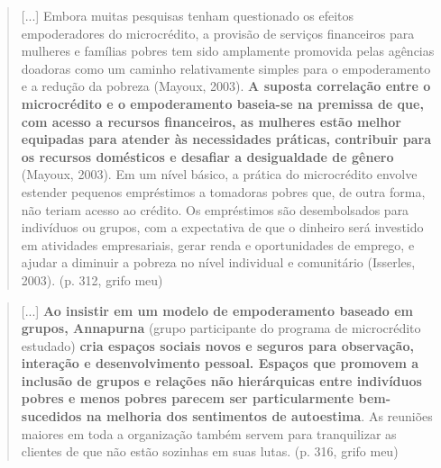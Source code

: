 \begin{quote}
    [...] Embora muitas pesquisas tenham questionado os efeitos empoderadores do microcrédito, a provisão de serviços financeiros para mulheres e famílias pobres tem sido amplamente promovida pelas agências doadoras como um caminho relativamente simples para o empoderamento e a redução da pobreza (Mayoux, 2003). \textbf{A suposta correlação entre o microcrédito e o empoderamento baseia-se na premissa de que, com acesso a recursos financeiros, as mulheres estão melhor equipadas para atender às necessidades práticas, contribuir para os recursos domésticos e desafiar a desigualdade de gênero} (Mayoux, 2003). Em um nível básico, a prática do microcrédito envolve estender pequenos empréstimos a tomadoras pobres que, de outra forma, não teriam acesso ao crédito. Os empréstimos são desembolsados para indivíduos ou grupos, com a expectativa de que o dinheiro será investido em atividades empresariais, gerar renda e oportunidades de emprego, e ajudar a diminuir a pobreza no nível individual e comunitário (Isserles, 2003). (p. 312, grifo meu)
\end{quote}

\begin{quote}
    [...] \textbf{Ao insistir em um modelo de empoderamento baseado em grupos, Annapurna} (grupo participante do programa de microcrédito estudado) \textbf{cria espaços sociais novos e seguros para observação, interação e desenvolvimento pessoal. Espaços que promovem a inclusão de grupos e relações não hierárquicas entre indivíduos pobres e menos pobres parecem ser particularmente bem-sucedidos na melhoria dos sentimentos de autoestima}. As reuniões maiores em toda a organização também servem para tranquilizar as clientes de que não estão sozinhas em suas lutas. (p. 316, grifo meu) 
\end{quote}

